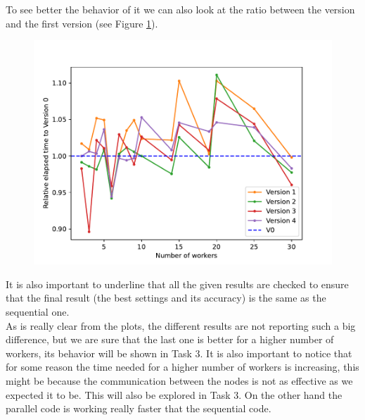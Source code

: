 \documentclass[a4paper]{article}
\theoremstyle{definition}
\theoremstyle{remark}
\begin{document}
To see better the behavior of it we can also look at the ratio between the version and the first version (see Figure \ref{fig:figure3}).
\begin{figure}
    \includegraphics[width = \textwidth]{ex2.1.pdf}
    \label{fig:figure3}
\end{figure}
It is also important to underline that all the given results are checked to ensure that the final result 
(the best settings and its accuracy) 
is the same as the sequential one.\\
As is really clear from the plots, the different results are not reporting such a big difference, but we are sure that the last one 
is better for a higher number of workers, its behavior will be shown in Task 3. It is also important to notice that for some reason 
the time needed for a higher number of workers is increasing, this might be because the communication between the nodes 
is not as effective as we expected it to be. This will also be explored in Task 3. On the other hand the parallel code is working really 
faster that the sequential code.
\end{document}
